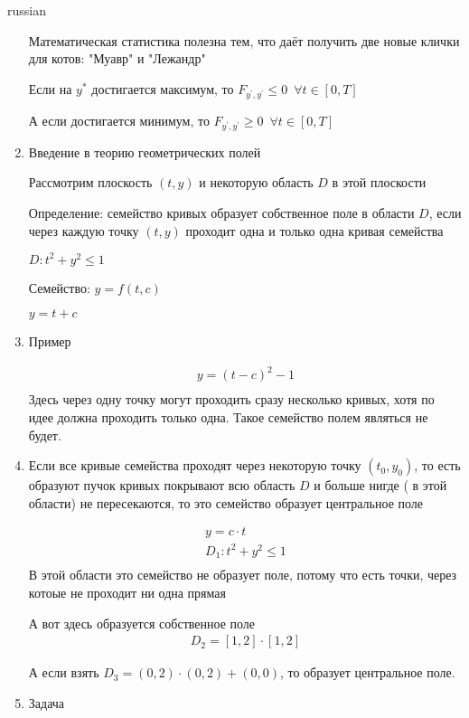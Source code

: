 \documentclass{article}
\begin{document}
\begin{otherlanguage*}{russian}
\begin{enumerate}
Математическая статистика полезна тем, что даёт получить две новые клички для котов: "Муавр" и "Лежандр" 

Если на $ y ^ * $ достигается максимум, то $ F_{y^{'}, y^{'}} \le 0 \,\,\,\forall t \in [0, T] $ 

А если достигается минимум, то $ F_{y^{'}, y^{'}} \ge 0 \,\,\, \forall t \in [0, T] $

\item Введение в теорию геометрических полей 

Рассмотрим плоскость $ (t, y) $ и некоторую область $ D $ в этой плоскости 

Определение: семейство кривых образует собственное поле в области $ D $, если через каждую точку $ (t, y) $ проходит одна и только одна кривая семейства  

$ D: t^2 + y^2 \le 1 $ 

Семейство: $ y = f(t, c) $ 

$ y = t + c $ 

\item Пример

\begin{align*}
y = (t - c) ^ 2 - 1  \\ 
\end{align*}
Здесь через одну точку могут проходить сразу несколько кривых, хотя по идее должна проходить только одна. Такое семейство полем являться не будет. 

\item Если все кривые семейства проходят через некоторую точку $ (t_0, y_0 ) $, то есть образуют пучок кривых покрывают всю область $ D $ и больше нигде ( в этой области)  не пересекаются, то это семейство образует центральное поле

\begin{align*}
y = c \cdot t \\
D_1 : t ^ 2 + y^2 \le 1 \\
\end{align*}
В этой области это семейство не образует поле, потому что есть точки, через котоые не проходит ни одна прямая

А вот здесь образуется собственное поле 
\begin{align*}
D_2 = [1, 2] \cdot [1, 2]
\end{align*}

А если взять $ D_3 = (0, 2) \cdot (0, 2) + (0,0) $, то образует центральное поле. 

\item Задача


\end{enumerate}
\end{otherlanguage*}
\end{document}
